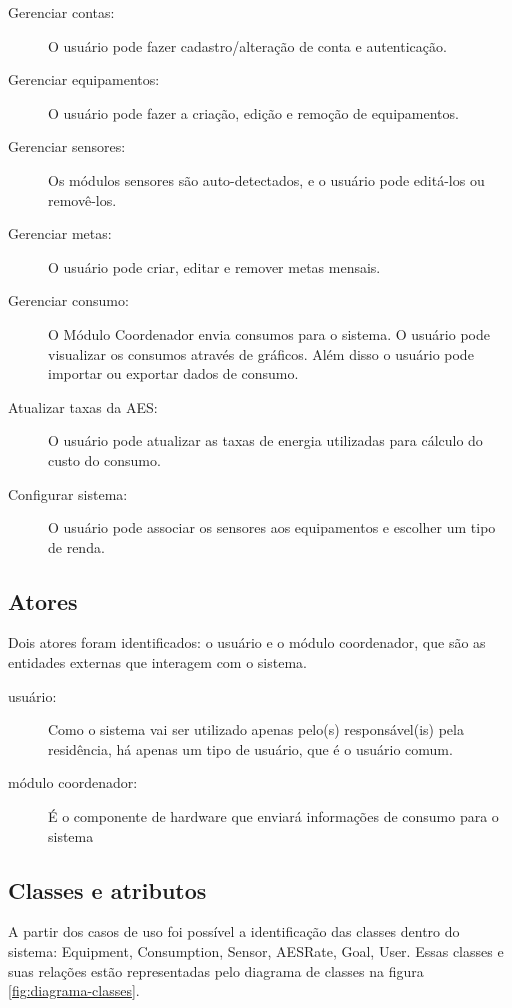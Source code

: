 \begin{description}
	\item[Gerenciar contas:] O usuário pode fazer cadastro/alteração de conta e autenticação.
	\item[Gerenciar equipamentos:] O usuário pode fazer a criação, edição e remoção de equipamentos.
	\item[Gerenciar sensores:] Os módulos sensores são auto-detectados, e o usuário pode editá-los ou removê-los.
	\item[Gerenciar metas:] O usuário pode criar, editar e remover metas mensais.
	\item[Gerenciar consumo:] O Módulo Coordenador envia consumos para o sistema. O usuário pode visualizar os consumos através de gráficos. Além disso o usuário pode importar ou exportar dados de consumo.
	\item[Atualizar taxas da AES:] O usuário pode atualizar as taxas de energia utilizadas para cálculo do custo do consumo.
	\item[Configurar sistema:] O usuário pode associar os sensores aos equipamentos e escolher um tipo de renda.
\end{description}

\subsection{Atores}

Dois atores foram identificados: o usuário e o módulo coordenador, que são as entidades externas que interagem com o sistema.

\begin{description}
	\item[usuário:] Como o sistema vai ser utilizado apenas pelo(s) responsável(is) pela residência, há apenas um tipo de usuário, que é o usuário comum.
    \item[módulo coordenador:] É o componente de hardware que enviará informações de consumo para o sistema
\end{description}

%
\subsection{Classes e atributos}

A partir dos casos de uso foi possível a identificação das classes dentro do sistema: Equipment, Consumption, Sensor, AESRate, Goal, User. Essas classes e suas relações estão representadas pelo diagrama de classes na figura \ref{fig:diagrama-classes}.

